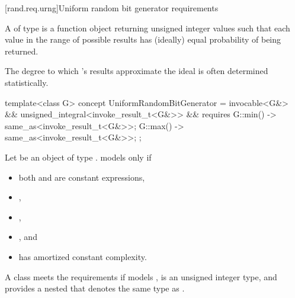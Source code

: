 %




[rand.req.urng]{Uniform random bit generator requirements}%
%

\pnum
A 
 of type 
is a function object
returning unsigned integer values
such that each value
in the range of possible results
has (ideally) equal probability
of being returned.
\begin{note}
 The degree to which 's results
 approximate the ideal
 is often determined statistically.
\end{note}

\begin{codeblock}
template<class G>
  concept UniformRandomBitGenerator =
    invocable<G&> && unsigned_integral<invoke_result_t<G&>> &&
    requires {
      { G::min() } -> same_as<invoke_result_t<G&>>;
      { G::max() } -> same_as<invoke_result_t<G&>>;
    };
\end{codeblock}

\pnum
Let  be an object of type .  models
 only if

\begin{itemize}
\item both  and  are constant
  expressions,
\item {},
\item {},
\item {}, and
\item {} has amortized constant complexity.
\end{itemize}

%
%
\pnum
A class  meets the  requirements if
 models ,
 is an unsigned integer type,
and
 provides a nested  
that denotes the same type as .


